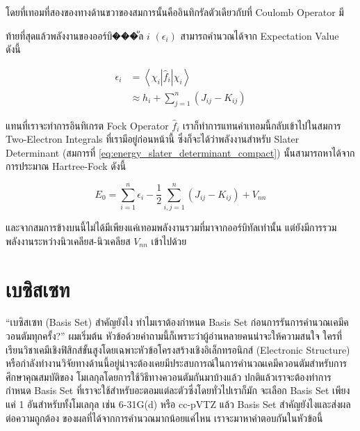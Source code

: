 \noindent โดยที่เทอมที่สองของทางด้านขวาของสมการนั้นคืออินทิกรัลตัวเดียวกับที่ Coulomb Operator มี

ท้ายที่สุดแล้วพลังงานของออร์บิ���ัล $i$ $(\epsilon_{i})$ สามารถคำนวณได้จาก Expectation Value ดังนี้

\begin{equation}
  \begin{aligned}
    \epsilon_i
     & = \left\langle\chi_i\left|\hat{f}_i\right| \chi_i\right\rangle \\
     & \approx h_i+\sum_{j=1}^n\left(J_{i j}-K_{i j}\right)
  \end{aligned}
\end{equation}

\noindent แทนที่เราจะทำการอินทิเกรต Fock Operator $\hat{f}_i$ เราก็ทำการแทนค่าเทอมนี้กลับเข้าไปในสมการ Two-Electron Integrals
ที่เรามีอยู่ก่อนหน้านี้ ซึ่งก็จะได้ว่าพลังงานสำหรับ Slater Determinant (สมการที่ \eqref{eq:energy_slater_determinant_compact})
นั้นสามารถหาได้จากการประมาณ Hartree-Fock ดังนี้

\begin{equation}
  E_0
  =
  \sum_{i=1}^n \epsilon_i
  -\frac{1}{2} \sum_{i, j=1}^n\left(J_{i j}-K_{i j}\right)
  + V_{n n}
\end{equation}

\noindent และจากสมการข้างบนนี้ไม่ได้มีเพียงแค่เทอมพลังงานรวมที่มาจากออร์บิทัลเท่านั้น แต่ยังมีการรวมพลังงานระหว่างนิวเคลียส-นิวเคลียส
$V_{n n}$ เข้าไปด้วย

\section{เบซิสเซท}

\enquote{เบซิสเซท (Basis Set) สำคัญยังไง ทำไมเราต้องกำหนด Basis Set ก่อนการรันการคำนวณเคมีควอนตัมทุกครั้ง?} ผมเริ่มต้น%
หัวข้อด้วยคำถามนี้ก็เพราะว่าผู้อ่านหลายคนน่าจะให้ความสนใจ ใครที่เรียนวิชาเคมีเชิงฟิสิกส์ขั้นสูงโดยเฉพาะหัวข้อโครงสร้างเชิงอิเล็กทรอนิกส์
(Electronic Structure) หรือกำลังทำงานวิจัยทางด้านนี้อยู่น่าจะต้องเคยมีประสบการณ์ในการคำนวณเคมีควอนตัมสำหรับการศึกษาคุณสมบัติของ%
โมเลกุลโดยการใช้วิธีทางควอนตัมกันมาบ้างแล้ว ปกติแล้วเราจะต้องทำการกำหนด Basis Set ที่เราจะใช้สำหรับอะตอมแต่ละตัวซึ่งโดยทั่วไปเราก็มัก%
จะเลือก Basis Set เพียงแค่ 1 อันสำหรับทั้งโมเลกุล เช่น 6-31G(d) หรือ cc-pVTZ แล้ว Basis Set สำคัญยังไงและส่งผลต่อความถูกต้อง%
ของผลที่ได้จากการคำนวณมากน้อยแค่ไหน เราจะมาหาคำตอบกันในหัวข้อนี้

